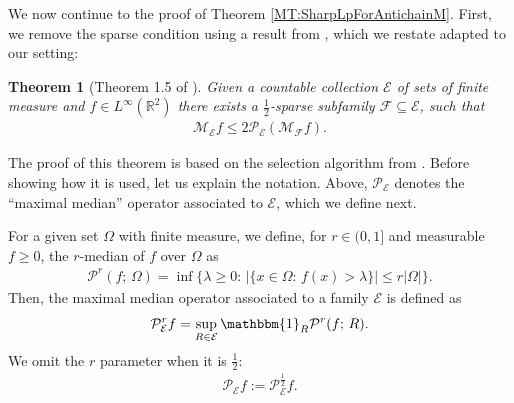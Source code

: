 \documentclass[oneside]{amsart}
\newtheorem{theorem}{Theorem}
\theoremstyle{definition}
\theoremstyle{plain}
\numberwithin{equation}{section}
\numberwithin{theorem}{section}
\newcommand{\ind}{\mathbbm{1}}
\begin{document}
We now continue to the proof of Theorem \ref{MT:SharpLpForAntichainM}.
First, we remove the sparse condition using a result from \cite{CLR2026}, which
we restate adapted to our setting:
\begin{theorem}[Theorem 1.5 of \cite{CLR2026}]
  \label{CLR:SparseDomination}
  Given a countable collection $\mathcal{E}$ of sets of finite measure
  and $f \in L^\infty(\mathbb{R}^2)$ there exists a $\frac{1}{2}$-sparse
  subfamily $\mathcal{F} \subseteq \mathcal{E}$, such that
  \begin{align*}
    \mathcal{M}_{\mathcal{E}} f \leq
    2 \mathcal{P}_{\mathcal{E}}( \mathcal{M}_{\mathcal{F}} f).
  \end{align*}
\end{theorem}
The proof of this theorem is based on the selection algorithm from
\cite{CordobaFefferman1975}.
Before showing how it is used, let us explain the notation.
Above, $\mathcal{P}_{\mathcal{E}}$ denotes the ``maximal median''
operator associated to $\mathcal{E}$, which we define next.

For a given set $\Omega$ with finite measure, we define, for $r \in (0,1]$ and
measurable $f \geq 0$, the $r$-median of $f$ over $\Omega$ as
\begin{align*}
  \mathcal{P}^r(f;\, \Omega) = \inf\Big\{\lambda \geq  0:\,
    |\{x \in \Omega:\, f(x) > \lambda\}| \leq r|\Omega|
  \Big\}.
\end{align*}
Then, the maximal median operator associated to a family $\mathcal{E}$ is
defined as
\begin{align*}
  \mathcal{P}^r_{\mathcal{E}} f =
    \sup_{R \in \mathcal{E}} \ind_R \mathcal{P}^r(f;\, R).
\end{align*}
We omit the $r$ parameter when it is $\frac{1}{2}$:
\begin{align*}
  \mathcal{P}_{\mathcal{E}}f := \mathcal{P}^{\frac{1}{2}}_{\mathcal{E}}f.
\end{align*}
\end{document}
